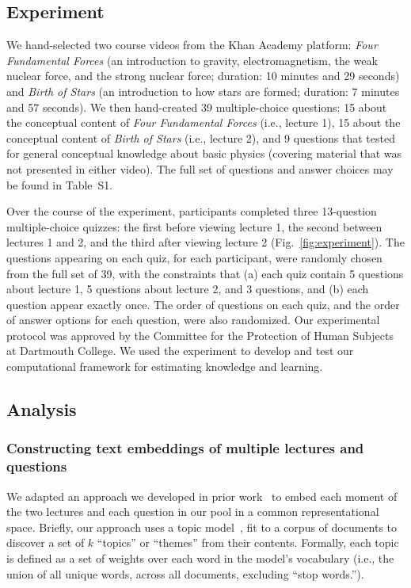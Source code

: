 \documentclass[10pt]{article}
\newcommand{\questions}{S1}
\begin{document}
\subsection*{Experiment}\label{subsec:experiment}

We hand-selected two course videos from the Khan Academy platform: \textit{Four
Fundamental Forces} (an introduction to gravity, electromagnetism, the weak
nuclear force, and the strong nuclear force; duration: 10 minutes and 29
seconds) and \textit{Birth of Stars} (an introduction to how stars are formed;
duration: 7 minutes and 57 seconds). We then hand-created 39 multiple-choice
questions: 15 about the conceptual content of \textit{Four Fundamental Forces} (i.e., lecture 1),
15 about the conceptual content of \textit{Birth of Stars} (i.e., lecture 2), and 9
questions that tested for general conceptual knowledge about basic physics
(covering material that was not presented in either video). The full set of
questions and answer choices may be found in Table~\questions.

Over the course of the experiment, participants completed three 13-question 
multiple-choice quizzes: the first before viewing lecture 1, the second between 
lectures 1 and 2, and the third after viewing lecture 2 (Fig.~\ref{fig:experiment}). 
The questions appearing on each quiz, for each participant, were randomly 
chosen from the full set of 39, with the constraints that (a) each quiz contain 5
questions about lecture 1, 5 questions about lecture 2, and 3 questions, and 
(b) each question appear exactly once. The order of questions on each quiz,
and the order of answer options for each question, were also randomized. Our
experimental protocol was approved by the Committee for the Protection of 
Human Subjects at Dartmouth College.  We used the experiment to develop 
and test our computational framework for estimating knowledge and learning.

\subsection*{Analysis}

\subsubsection*{Constructing text embeddings of multiple lectures and questions}\label{subsec:topic-modeling}

We adapted an approach we developed in prior work~\citep{HeusEtal21} to embed
each moment of the two lectures and each question in our pool in a common representational space.
Briefly, our approach uses a topic model~\citep[Latent Dirichlet Allocation;][]{BleiEtal03}, 
fit to a corpus of documents to discover a set of $k$ ``topics'' or ``themes'' from their contents.
Formally, each topic is defined as a set of weights over each word in the model's vocabulary
(i.e., the union of all unique words, across all documents, excluding ``stop
words.'').
\end{document}
